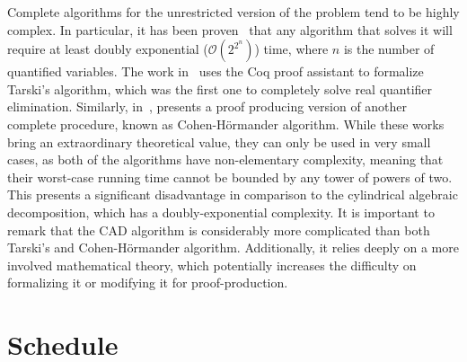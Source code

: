\documentclass[a4paper, 12pt]{article}
\begin{document}
Complete algorithms for the unrestricted version of the problem tend to be highly complex. In particular, it has been
proven~\cite{doublyExponential} that any algorithm that solves it will require at least doubly exponential
($\mathcal{O}(2^{2^{n}})$) time, where $n$ is the number of quantified variables. The work
in~\cite{coqTarski} uses the Coq proof assistant to formalize Tarski's algorithm, which was the first one to completely
solve real quantifier elimination. Similarly, in~\cite{mcLaughlin}, presents a proof producing version of another
complete procedure, known as Cohen-H{\"o}rmander algorithm. While these works bring an extraordinary theoretical
value, they can only be used in very small cases, as both of the algorithms have non-elementary complexity, meaning that
their worst-case running time cannot be bounded by any tower of powers of two. This presents a significant disadvantage
in comparison to the cylindrical algebraic decomposition, which has a doubly-exponential complexity. It is important to
remark that the CAD algorithm is considerably more complicated than both Tarski's and Cohen-H{\"o}rmander algorithm.
Additionally, it relies deeply on a more involved mathematical theory, which potentially increases the difficulty
on formalizing it or modifying it for proof-production.




\section{Schedule}
\end{document}
